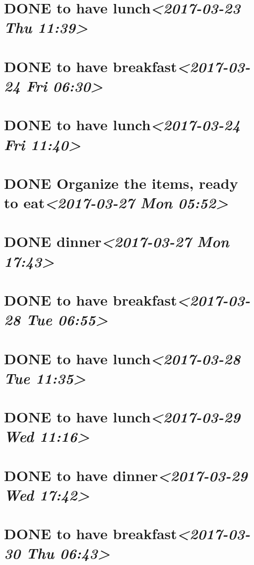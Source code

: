 \documentclass[cyan]{elegantnote}
\begin{document}
\section{{\bfseries\sffamily DONE} to have lunch\textit{<2017-03-23 Thu 11:39>}}
\label{sec:orgaf109e9}
\section{{\bfseries\sffamily DONE} to have breakfast\textit{<2017-03-24 Fri 06:30>}}
\label{sec:org6fcfa94}
\section{{\bfseries\sffamily DONE} to have lunch\textit{<2017-03-24 Fri 11:40>}}
\label{sec:org3e142d7}
\section{{\bfseries\sffamily DONE} Organize the items, ready to eat\textit{<2017-03-27 Mon 05:52>}}
\label{sec:org2aec2ba}
\section{{\bfseries\sffamily DONE} dinner\textit{<2017-03-27 Mon 17:43>}}
\label{sec:org7f46732}
\section{{\bfseries\sffamily DONE} to have breakfast\textit{<2017-03-28 Tue 06:55>}}
\label{sec:org9c3e7b5}
\section{{\bfseries\sffamily DONE} to have lunch\textit{<2017-03-28 Tue 11:35>}}
\label{sec:org74c2452}
\section{{\bfseries\sffamily DONE} to have lunch\textit{<2017-03-29 Wed 11:16>}}
\label{sec:org0a032a1}
\section{{\bfseries\sffamily DONE} to have dinner\textit{<2017-03-29 Wed 17:42>}}
\label{sec:orgc7655e6}
\section{{\bfseries\sffamily DONE} to have breakfast\textit{<2017-03-30 Thu 06:43>}}
\label{sec:orgfc63a10}
\end{document}
